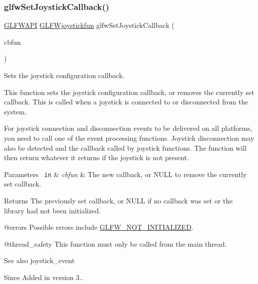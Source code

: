 \subsubsection{\texorpdfstring{glfwSetJoystickCallback()}{glfwSetJoystickCallback()}}
{\footnotesize\ttfamily \mbox{\hyperlink{glfw3_8h_a56da5036b2cc259351ae22fd6439bb47}{G\+L\+F\+W\+A\+PI}} \mbox{\hyperlink{group__input_gaa67aa597e974298c748bfe4fb17d406d}{G\+L\+F\+Wjoystickfun}} glfw\+Set\+Joystick\+Callback (\begin{DoxyParamCaption}\item[{\mbox{\hyperlink{group__input_gaa67aa597e974298c748bfe4fb17d406d}{G\+L\+F\+Wjoystickfun}}}]{cbfun }\end{DoxyParamCaption})}



Sets the joystick configuration callback. 

This function sets the joystick configuration callback, or removes the currently set callback. This is called when a joystick is connected to or disconnected from the system.

For joystick connection and disconnection events to be delivered on all platforms, you need to call one of the event processing functions. Joystick disconnection may also be detected and the callback called by joystick functions. The function will then return whatever it returns if the joystick is not present.


\begin{DoxyParams}[1]{Parameters}
\mbox{\texttt{ in}}  & {\em cbfun} & The new callback, or {\ttfamily N\+U\+LL} to remove the currently set callback. \\
\hline
\end{DoxyParams}
\begin{DoxyReturn}{Returns}
The previously set callback, or {\ttfamily N\+U\+LL} if no callback was set or the library had not been initialized.
\end{DoxyReturn}
@errors Possible errors include \mbox{\hyperlink{group__errors_ga2374ee02c177f12e1fa76ff3ed15e14a}{G\+L\+F\+W\+\_\+\+N\+O\+T\+\_\+\+I\+N\+I\+T\+I\+A\+L\+I\+Z\+ED}}.

@thread\+\_\+safety This function must only be called from the main thread.

\begin{DoxySeeAlso}{See also}
joystick\+\_\+event
\end{DoxySeeAlso}
\begin{DoxySince}{Since}
Added in version 3.. 
\end{DoxySince}
\mbox{\label{group__input_ga3a8999c2d2634c7bcf4a04f1ec64895c}} 
